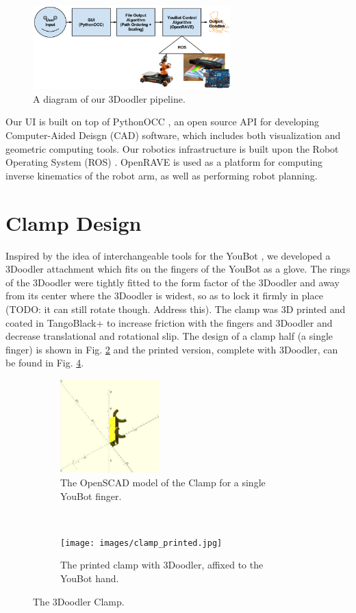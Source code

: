\documentclass[conference]{acmsiggraph}
\begin{document}
\begin{figure}[t]
\centering
\includegraphics[width=3.0in]{images/system_arch.png}
\caption{A diagram of our 3Doodler pipeline.}
\label{fig:systemarchitecture}
\end{figure}

Our UI is built on top of PythonOCC \cite{PythonOCC}, an open source API for developing Computer-Aided Deisgn (CAD) software, which includes both visualization and geometric computing tools.  Our robotics infrastructure is built upon the Robot Operating System (ROS) \cite{ROS}.  OpenRAVE \cite{OpenRAVE} is used as a platform for computing inverse kinematics of the robot arm, as well as performing robot planning.




\section{Clamp Design}
Inspired by the idea of interchangeable tools for the YouBot \cite{Knepper13}, we developed a 3Doodler attachment which fits on the fingers of the YouBot as a glove.  The rings of the 3Doodler were tightly fitted to the form factor of the 3Doodler and away from its center where the 3Doodler is widest, so as to lock it firmly in place (TODO: it can still rotate though.  Address this). The clamp was 3D printed and coated in TangoBlack+ \cite{TangoBlack} to increase friction with the fingers and 3Doodler and decrease translational and rotational slip.  The design of a clamp half (a single finger) is shown in Fig. \ref{fig:halfclamp} and the printed version, complete with 3Doodler, can be found in Fig. \ref{fig:printedclamp}.  

\begin{figure}[t!]
\centering

\begin{subfigure}[t]{1.5in}
\centering
\includegraphics[width=1.5in]{images/clamp.png}
\caption{The OpenSCAD model of the Clamp for a single YouBot finger.}
\label{fig:halfclamp}
\end{subfigure}
~
\begin{subfigure}[t]{1.5in}
\centering
\texttt{[image: images/clamp\_printed.jpg]}
\caption{The printed clamp with 3Doodler, affixed to the YouBot hand.}
\label{fig:printedclamp}
\end{subfigure}
\caption{The 3Doodler Clamp.}
\end{figure}
\end{document}

